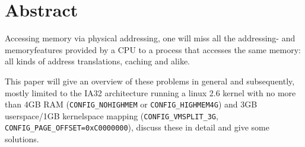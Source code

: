 %
%

\section{Abstract}

Accessing memory via physical addressing, one will miss all the addressing- and
memoryfeatures provided by a CPU to a process that accesses the same memory: all
kinds of address translations, caching and alike.

This paper will give an overview of these problems in general and subsequently,
mostly limited to the IA32 architecture running a linux 2.6 kernel with no more
than 4GB RAM (\texttt{CONFIG\_NOHIGHMEM} or \texttt{CONFIG\_HIGHMEM4G}) and 3GB
userspace/1GB kernelspace mapping (\texttt{CONFIG\_VMSPLIT\_3G},
\texttt{CONFIG\_PAGE\_OFFSET=0xC0000000}), discuss these in detail and give some
solutions. \label{ia32_config_options}





